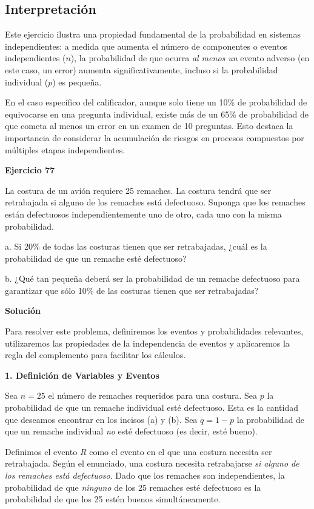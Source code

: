 \documentclass[a4paper]{article}
\begin{document}
\subsection*{Interpretación}

Este ejercicio ilustra una propiedad fundamental de la probabilidad en sistemas independientes: a medida que aumenta el número de componentes o eventos independientes ($n$), la probabilidad de que ocurra \textit{al menos un} evento adverso (en este caso, un error) aumenta significativamente, incluso si la probabilidad individual ($p$) es pequeña.

En el caso específico del calificador, aunque solo tiene un 10\% de probabilidad de equivocarse en una pregunta individual, existe más de un 65\% de probabilidad de que cometa al menos un error en un examen de 10 preguntas. Esto destaca la importancia de considerar la acumulación de riesgos en procesos compuestos por múltiples etapas independientes.


\textbf{Ejercicio 77}

La costura de un avión requiere 25 remaches. La costura tendrá que ser retrabajada si alguno de los remaches está defectuoso. Suponga que los remaches están defectuosos independientemente uno de otro, cada uno con la misma probabilidad.

a. Si 20\% de todas las costuras tienen que ser retrabajadas, ¿cuál es la probabilidad de que un remache esté defectuoso?

b. ¿Qué tan pequeña deberá ser la probabilidad de un remache defectuoso para garantizar que sólo 10\% de las costuras tienen que ser retrabajadas?

\vspace{0.5cm}

\textbf{Solución}

Para resolver este problema, definiremos los eventos y probabilidades relevantes, utilizaremos las propiedades de la independencia de eventos y aplicaremos la regla del complemento para facilitar los cálculos.

\textbf{1. Definición de Variables y Eventos}

Sea $n = 25$ el número de remaches requeridos para una costura.
Sea $p$ la probabilidad de que un remache individual esté defectuoso. Esta es la cantidad que deseamos encontrar en los incisos (a) y (b).
Sea $q = 1 - p$ la probabilidad de que un remache individual \textit{no} esté defectuoso (es decir, esté bueno).

Definimos el evento $R$ como el evento en el que una costura necesita ser retrabajada.
Según el enunciado, una costura necesita retrabajarse \textit{si alguno de los remaches está defectuoso}.
Dado que los remaches son independientes, la probabilidad de que \textit{ninguno} de los 25 remaches esté defectuoso es la probabilidad de que los 25 estén buenos simultáneamente.
\end{document}

